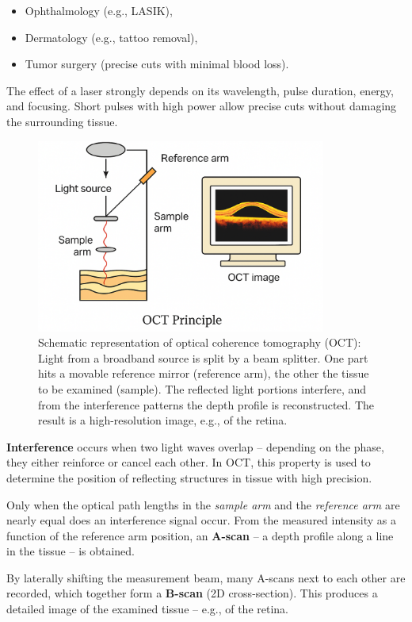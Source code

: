 \begin{itemize}
	\item Ophthalmology (e.g., LASIK),
	\item Dermatology (e.g., tattoo removal),
	\item Tumor surgery (precise cuts with minimal blood loss).
\end{itemize}

\begin{tcolorbox}[hinweisbox, title=Laser Parameters]
	\label{box:laserparameter}
	\small
	The effect of a laser strongly depends on its wavelength, pulse duration, energy, and focusing. Short pulses with high power allow precise cuts without damaging the surrounding tissue.
\end{tcolorbox}
\newpage
\noindent
\begin{figure}[H]
	\centering
	\includegraphics[width=0.85\textwidth]{bilder/oct.png}
	\caption{Schematic representation of optical coherence tomography (OCT): Light from a broadband source is split by a beam splitter. One part hits a movable reference mirror (reference arm), the other the tissue to be examined (sample). The reflected light portions interfere, and from the interference patterns the depth profile is reconstructed. The result is a high-resolution image, e.g., of the retina.}
	\label{fig:oct_prinzip}
\end{figure}

\begin{tcolorbox}[didaktikbox, title=Didactic Explanation: Interference in OCT]
	\label{box:interferenz_oct}
	\small
	\textbf{Interference} occurs when two light waves overlap – depending on the phase, they either reinforce or cancel each other. In OCT, this property is used to determine the position of reflecting structures in tissue with high precision.
	
	Only when the optical path lengths in the \emph{sample arm} and the \emph{reference arm} are nearly equal does an interference signal occur. From the measured intensity as a function of the reference arm position, an \textbf{A-scan} – a depth profile along a line in the tissue – is obtained.
	
	By laterally shifting the measurement beam, many A-scans next to each other are recorded, which together form a \textbf{B-scan} (2D cross-section). This produces a detailed image of the examined tissue – e.g., of the retina.
\end{tcolorbox}

